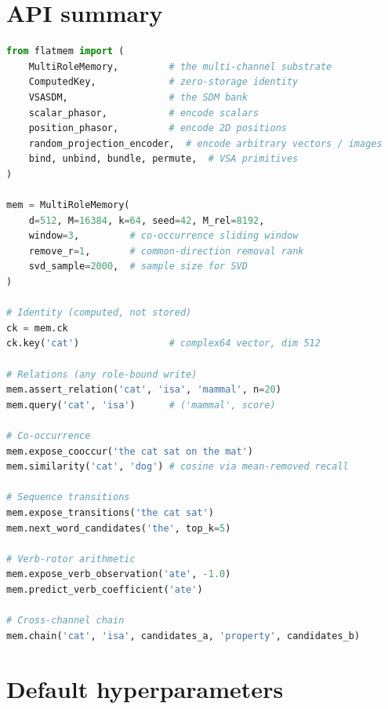 \documentclass[11pt,a4paper]{article}
\begin{document}
\section{API summary}
\label{app:api}

\begin{lstlisting}[language=Python]
from flatmem import (
    MultiRoleMemory,         # the multi-channel substrate
    ComputedKey,             # zero-storage identity
    VSASDM,                  # the SDM bank
    scalar_phasor,           # encode scalars
    position_phasor,         # encode 2D positions
    random_projection_encoder,  # encode arbitrary vectors / images
    bind, unbind, bundle, permute,  # VSA primitives
)

mem = MultiRoleMemory(
    d=512, M=16384, k=64, seed=42, M_rel=8192,
    window=3,         # co-occurrence sliding window
    remove_r=1,       # common-direction removal rank
    svd_sample=2000,  # sample size for SVD
)

# Identity (computed, not stored)
ck = mem.ck
ck.key('cat')                # complex64 vector, dim 512

# Relations (any role-bound write)
mem.assert_relation('cat', 'isa', 'mammal', n=20)
mem.query('cat', 'isa')      # ('mammal', score)

# Co-occurrence
mem.expose_cooccur('the cat sat on the mat')
mem.similarity('cat', 'dog') # cosine via mean-removed recall

# Sequence transitions
mem.expose_transitions('the cat sat')
mem.next_word_candidates('the', top_k=5)

# Verb-rotor arithmetic
mem.expose_verb_observation('ate', -1.0)
mem.predict_verb_coefficient('ate')

# Cross-channel chain
mem.chain('cat', 'isa', candidates_a, 'property', candidates_b)
\end{lstlisting}

\section{Default hyperparameters}
\label{app:hparams}
\end{document}
